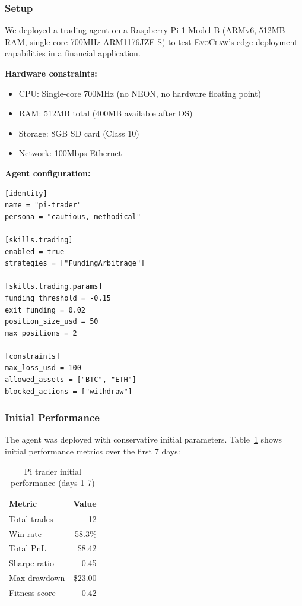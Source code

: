 \documentclass{article}
\newcommand{\evoclaw}{\textsc{EvoClaw}}
\begin{document}
\subsubsection{Setup}

We deployed a trading agent on a Raspberry Pi 1 Model B (ARMv6, 512MB RAM, single-core 700MHz ARM1176JZF-S) to test \evoclaw{}'s edge deployment capabilities in a financial application.

\textbf{Hardware constraints:}
\begin{itemize}[leftmargin=*]
    \item CPU: Single-core 700MHz (no NEON, no hardware floating point)
    \item RAM: 512MB total (400MB available after OS)
    \item Storage: 8GB SD card (Class 10)
    \item Network: 100Mbps Ethernet
\end{itemize}

\textbf{Agent configuration:}
\begin{lstlisting}[style=tomlcode]
[identity]
name = "pi-trader"
persona = "cautious, methodical"

[skills.trading]
enabled = true
strategies = ["FundingArbitrage"]

[skills.trading.params]
funding_threshold = -0.15
exit_funding = 0.02
position_size_usd = 50
max_positions = 2

[constraints]
max_loss_usd = 100
allowed_assets = ["BTC", "ETH"]
blocked_actions = ["withdraw"]
\end{lstlisting}

\subsubsection{Initial Performance}

The agent was deployed with conservative initial parameters. Table~\ref{tab:pi_initial} shows initial performance metrics over the first 7 days:

\begin{table}[h]
\centering
\caption{Pi trader initial performance (days 1-7)}
\label{tab:pi_initial}
\begin{tabular}{lr}
\toprule
\textbf{Metric} & \textbf{Value} \\
\midrule
Total trades & 12 \\
Win rate & 58.3\% \\
Total PnL & \$8.42 \\
Sharpe ratio & 0.45 \\
Max drawdown & \$23.00 \\
Fitness score & 0.42 \\
\bottomrule
\end{tabular}
\end{table}
\end{document}
